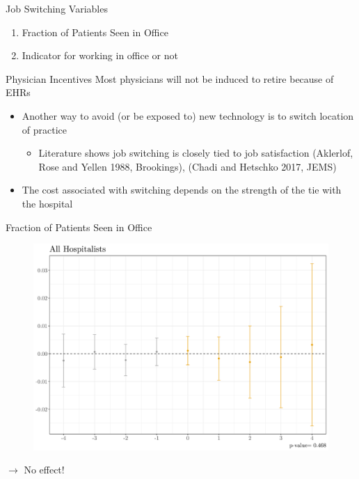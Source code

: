 \documentclass[10pt]{beamer}
\begin{document}
\begin{frame}{Job Switching Variables}
    \begin{enumerate}
        \item Fraction of Patients Seen in Office 
        \vspace{3mm}
        \item Indicator for working in office or not
    \end{enumerate}
\end{frame}



\begin{frame}{Physician Incentives}
Most physicians will not be induced to retire because of EHRs
    \begin{itemize}
        \item Another way to avoid (or be exposed to) new technology is to switch location of practice
        \begin{itemize}
            \vspace{3mm}
            \item Literature shows job switching is closely tied to job satisfaction \tiny (Aklerlof, Rose and Yellen 1988, Brookings), (Chadi and Hetschko 2017, JEMS)
        \end{itemize}
        \vspace{6mm}
        \pause
        \item The cost associated with switching depends on the strength of the tie with the hospital
    \end{itemize}
\end{frame}

\begin{frame}{Fraction of Patients Seen in Office}
\begin{figure}[ht]
    \centering
    \includegraphics[scale=.35]{Objects/Presentation_fracoffice_all.pdf}
\end{figure}
$\rightarrow$ No effect!
\end{frame}
\end{document}
